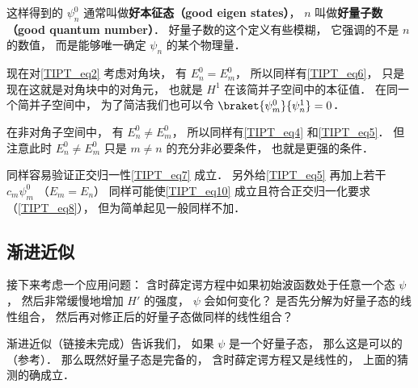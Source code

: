 这样得到的 $\psi_n^0$ 通常叫做\textbf{好本征态（good eigen states）}， $n$ 叫做\textbf{好量子数（good quantum number）}． 好量子数的这个定义有些模糊， 它强调的不是 $n$ 的数值， 而是能够唯一确定 $\psi_n$ 的某个物理量．

现在对\autoref{TIPT_eq2} 考虑对角块， 有 $E_n^0 = E_m^0$， 所以同样有\autoref{TIPT_eq6}， 只是现在这就是对角块中的对角元， 也就是 $H^1$ 在该简并子空间中的本征值． 在同一个简并子空间中， 为了简洁我们也可以令 $\braket{\psi_m^0}{\psi_n^1} = 0$．

在非对角子空间中， 有 $E_n^0 \ne E_m^0$， 所以同样有\autoref{TIPT_eq4} 和\autoref{TIPT_eq5}． 但注意此时 $E_n^0 \ne E_m^0$ 只是 $m \ne n$ 的充分非必要条件， 也就是更强的条件．

同样容易验证正交归一性\autoref{TIPT_eq7} 成立． 另外给\autoref{TIPT_eq5} 再加上若干 $c_m \psi_m^0$ （$E_m = E_n$） 同样可能使\autoref{TIPT_eq10} 成立且符合正交归一化要求（\autoref{TIPT_eq8}）， 但为简单起见一般同样不加．

\subsection{渐进近似}
接下来考虑一个应用问题： 含时薛定谔方程中如果初始波函数处于任意一个态 $\psi$， 然后非常缓慢地增加 $H'$ 的强度， $\psi$ 会如何变化？ 是否先分解为好量子态的线性组合， 然后再对修正后的好量子态做同样的线性组合？

渐进近似（链接未完成）告诉我们， 如果 $\psi$ 是一个好量子态， 那么这是可以的（参考\cite{GriffQ}）． 那么既然好量子态是完备的， 含时薛定谔方程又是线性的， 上面的猜测的确成立．
